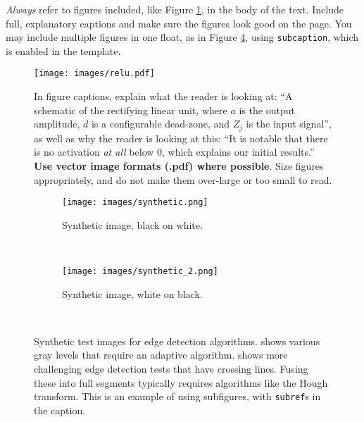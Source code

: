 \documentclass{l4proj}
\begin{document}
\emph{Always} refer to figures included, like Figure \ref{fig:relu}, in the body of the text. Include full, explanatory captions and make sure the figures look good on the page.
You may include multiple figures in one float, as in Figure \ref{fig:synthetic}, using \texttt{subcaption}, which is enabled in the template.



\begin{figure}
    \centering
    \texttt{[image: images/relu.pdf]}    

    \caption{In figure captions, explain what the reader is looking at: ``A schematic of the rectifying linear unit, where $a$ is the output amplitude,
    $d$ is a configurable dead-zone, and $Z_j$ is the input signal'', as well as why the reader is looking at this: 
    ``It is notable that there is no activation \emph{at all} below 0, which explains our initial results.'' 
    \textbf{Use vector image formats (.pdf) where possible}. Size figures appropriately, and do not make them over-large or too small to read.
    }

    \label{fig:relu} 
\end{figure}


\begin{figure}
    \centering
    \begin{subfigure}[b]{0.45\textwidth}
        \texttt{[image: images/synthetic.png]}
        \caption{Synthetic image, black on white.}
        \label{fig:syn1}
    \end{subfigure}
    ~ %
    \begin{subfigure}[b]{0.45\textwidth}
        \texttt{[image: images/synthetic\_2.png]}
        \caption{Synthetic image, white on black.}
        \label{fig:syn2}
    \end{subfigure}
    ~ %
    \caption{Synthetic test images for edge detection algorithms.  shows various gray levels that require an adaptive algorithm. 
    shows more challenging edge detection tests that have crossing lines. Fusing these into full segments typically requires algorithms like the Hough transform.
    This is an example of using subfigures, with \texttt{subref}s in the caption.
    }\label{fig:synthetic}
\end{figure}
\end{document}

